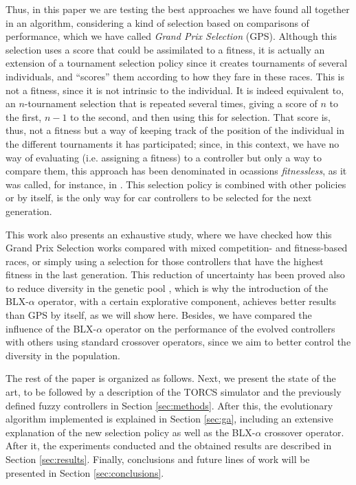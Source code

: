 \documentclass[10pt,journal,compsoc]{IEEEtran}
\begin{document}
Thus, in this paper we are testing the best approaches we have found
all together in an algorithm, considering a kind of selection based on
comparisons of performance, which we have called \textit{Grand Prix Selection}
(GPS). Although this selection uses a score that could be assimilated
to a fitness, it is actually an extension of a tournament selection
policy since it creates tournaments of several individuals, and
``scores'' them according to how they fare in these races. This is not
a fitness, since it is not intrinsic to the individual. It is indeed
equivalent to, an $n$-tournament selection that is repeated several
times, giving a score of $n$ to the first, $n-1$ to the second, and
then using this for selection. That score is, thus, not a fitness but
a way of keeping track of the position of the individual in the
different tournaments it has participated; since, in this context, we
have no way of evaluating (i.e. assigning a fitness) to a controller
but only a way to compare them, this approach has been denominated in
ocassions {\em
fitnessless}, as it was called, for instance, in
\cite{jaskowski2008winning}.  This selection policy is combined with
other policies or by itself, is the only way for car controllers to be
selected for the next generation.

This work also presents an exhaustive study, where we have checked how
this Grand Prix Selection works compared with mixed competition- and
fitness-based races, or simply using a selection for those controllers
that have the highest fitness in the last generation.  This reduction
of uncertainty has been proved also to reduce diversity in the genetic
pool \cite{DBLP:journals/tcci/MereloLFGCCRMGTCC16}, which is why the
introduction of the \mbox{BLX-$\alpha$} operator, with a certain
explorative component, achieves better results than GPS by itself, as
we will show here.  Besides, we have compared the influence of the
\mbox{BLX-$\alpha$} operator on the performance of the evolved
controllers with others using standard crossover operators, since we
aim to better control the diversity in the population.

The rest of the paper is organized as follows. Next, we present the
state of the art, to be followed by a description of the TORCS
simulator and the previously defined fuzzy controllers in Section
\ref{sec:methods}. After this, the evolutionary algorithm implemented
is explained in Section \ref{sec:ga}, including an extensive explanation of the new selection policy as well as the BLX-$\alpha$ crossover operator. After it, the experiments conducted and the obtained results are described in
Section \ref{sec:results}. Finally, conclusions and future lines of
work will be presented in Section \ref{sec:conclusions}. 
\end{document}
